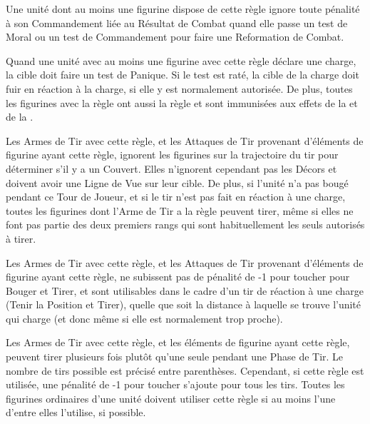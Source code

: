 
Une unité dont au moins une figurine dispose de cette règle ignore toute pénalité à son Commandement liée au Résultat de Combat quand elle passe un test de Moral ou un test de Commandement pour faire une Reformation de Combat.


Quand une unité avec au moins une figurine avec cette règle déclare une charge, la cible doit faire un test de Panique. Si le test est raté, la cible de la charge doit fuir en réaction à la charge, si elle y est normalement autorisée. De plus, toutes les figurines avec la règle \terror{} ont aussi la règle \fear{} et sont immunisées aux effets de la \fear{} et de la \terror{}.


Les Armes de Tir avec cette règle, et les Attaques de Tir provenant d'éléments de figurine ayant cette règle, ignorent les figurines sur la trajectoire du tir pour déterminer s'il y a un Couvert. Elles n'ignorent cependant pas les Décors et doivent avoir une Ligne de Vue sur leur cible. De plus, si l'unité n'a pas bougé pendant ce Tour de Joueur, et si le tir n'est pas fait en réaction à une charge, toutes les figurines dont l'Arme de Tir a la règle \volleyfire{} peuvent tirer, même si elles ne font pas partie des deux premiers rangs qui sont habituellement les seuls autorisés à tirer.


Les Armes de Tir avec cette règle, et les Attaques de Tir provenant d'éléments de figurine ayant cette règle, ne subissent pas de pénalité de -1 pour toucher pour Bouger et Tirer, et sont utilisables dans le cadre d'un tir de réaction à une charge (Tenir la Position et Tirer), quelle que soit la distance à laquelle se trouve l'unité qui charge (et donc même si elle est normalement trop proche).


Les Armes de Tir avec cette règle, et les éléments de figurine ayant cette règle, peuvent tirer plusieurs fois plutôt qu'une seule pendant une Phase de Tir. Le nombre de tirs possible est précisé entre parenthèses. Cependant, si cette règle est utilisée, une pénalité de -1 pour toucher s'ajoute pour tous les tirs. Toutes les figurines ordinaires d'une unité doivent utiliser cette règle si au moins l'une d'entre elles l'utilise, si possible.

